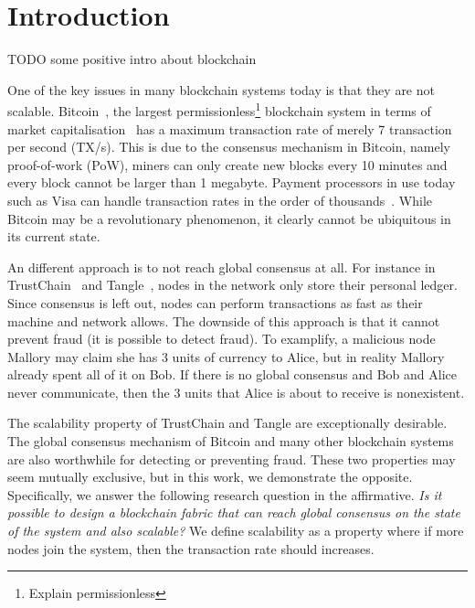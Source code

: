 \chapter{Introduction}
\label{ch:intro}

TODO some positive intro about blockchain

One of the key issues in many blockchain systems today is that they are not scalable.
Bitcoin~\cite{bitcoin}, the largest permissionless\footnote{Explain permissionless} blockchain system
in terms of market capitalisation~\cite{bitcoinmarketcap} has a maximum transaction rate of merely 7 transaction per second (TX/s).
This is due to the consensus mechanism in Bitcoin, namely proof-of-work (PoW),
miners can only create new blocks every 10 minutes and every block cannot be larger than 1 megabyte.
Payment processors in use today such as Visa can handle transaction rates in the order of thousands~\cite{visa}.
While Bitcoin may be a revolutionary phenomenon, it clearly cannot be ubiquitous in its current state.

An different approach is to not reach global consensus at all.
For instance in TrustChain~\cite{multichain} and Tangle~\cite{tangle},
nodes in the network only store their personal ledger.
Since consensus is left out, nodes can perform transactions as fast as their machine and network allows.
The downside of this approach is that it cannot prevent fraud (it is possible to detect fraud).
To examplify, a malicious node Mallory may claim she has 3 units of currency to Alice,
but in reality Mallory already spent all of it on Bob.
If there is no global consensus and Bob and Alice never communicate,
then the 3 units that Alice is about to receive is nonexistent.

The scalability property of TrustChain and Tangle are exceptionally desirable.
The global consensus mechanism of Bitcoin and many other blockchain systems are also worthwhile for detecting or preventing fraud.
These two properties may seem mutually exclusive, but in this work, we demonstrate the opposite.
Specifically, we answer the following research question in the affirmative.
\emph{Is it possible to design a blockchain fabric that can reach global consensus on the state of the system 
and also scalable?} We define scalability as a property where if more nodes join the system, then the transaction rate should increases.

